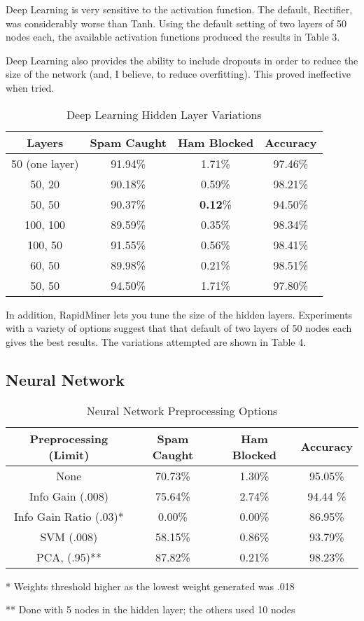 \documentclass[10pt,journal,compsoc]{IEEEtran}
\begin{document}
Deep Learning is very sensitive to the activation function. The default, Rectifier, was considerably worse than Tanh. Using the default setting of two layers of 50 nodes each, the available activation functions produced the results in Table 3.

Deep Learning also provides the ability to include dropouts in order to reduce the size of the network (and, I believe, to reduce overfitting). This proved ineffective when tried.

\begin{table}[!t]
\renewcommand{\arraystretch}{1.3}
\caption{Deep Learning Hidden Layer Variations}
\label{Table 4}
\centering
\begin{tabular}{|c|c|c|c|}
\hline
Layers & Spam Caught & Ham Blocked & Accuracy \\ \hline
50 (one layer) & 91.94\% & 1.71\% & 97.46\% \\ \hline
50, 20 & 90.18\% & 0.59\% & 98.21\% \\ \hline
50, 50 & 90.37\% & \textbf{0.12}\% & 94.50\% \\ \hline
100, 100 & 89.59\% & 0.35\% & 98.34\% \\ \hline
100, 50 & 91.55\% & 0.56\% & 98.41\% \\ \hline
60, 50 & 89.98\% & 0.21\% & 98.51\% \\ \hline
50, 50 & 94.50\% & 1.71\% & 97.80\% \\ \hline

\end{tabular}
\end{table}

In addition, RapidMiner lets you tune the size of the hidden layers. Experiments with a variety of options suggest that that default of two layers of 50 nodes each gives the best results. The variations attempted are shown in Table 4.

\subsection{Neural Network}

\begin{table}[!t]
\renewcommand{\arraystretch}{1.3}
\caption{Neural Network Preprocessing Options}
\label{Table 5}
\centering
\begin{tabular}{|c|c|c|c|}
\hline
Preprocessing (Limit) & Spam Caught & Ham Blocked & Accuracy \\ \hline
None & 70.73\% & 1.30\% & 95.05\% \\ \hline
Info Gain (.008) & 75.64\% & 2.74\% & 94.44 \% \\ \hline
Info Gain Ratio (.03)* & 0.00\% & 0.00\% & 86.95\% \\ \hline
SVM (.008) & 58.15\% & 0.86\% & 93.79\% \\ \hline
PCA, (.95)** & 87.82\% & 0.21\% & 98.23\% \\ \hline
\end{tabular}

\smallskip
* Weights threshold higher as the lowest weight generated was .018

** Done with 5 nodes in the hidden layer; the others used 10 nodes
\end{table}
\end{document}
